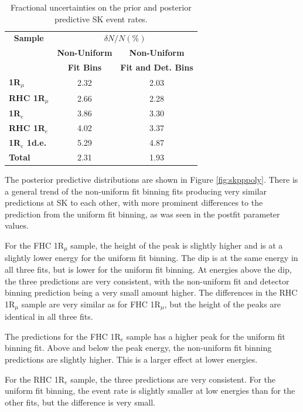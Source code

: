 \begin{center}
\begin{table}
\center
\begin{tabular}{l||c c}
\hline \hline
\multicolumn{1}{c||}{\textbf{Sample}} & \multicolumn{2}{c}{$\delta N/N (\%)$}\\
& \multicolumn{1}{c}{\textbf{Non-Uniform}} & \multicolumn{1}{c}{\textbf{Non-Uniform}}\\
& \multicolumn{1}{c}{\textbf{Fit Bins}} & \multicolumn{1}{c}{\textbf{Fit and Det. Bins}}\\
\hline\hline
\textbf{1R$_{\mu}$} & 2.32 & 2.03\\
\textbf{RHC 1R$_{\mu}$} & 2.66 & 2.28 \\ 
\textbf{1R$_{e}$} & 3.86 & 3.30\\
\textbf{RHC 1R$_{e}$} & 4.02 & 3.37\\
\textbf{1R$_{e}$ 1d.e.} & 5.29 & 4.87\\ \hline
\textbf{Total} & 2.31 & 1.93\\ \hline\hline
\end{tabular}
\caption{Fractional uncertainties on the prior and posterior predictive SK event rates.}
\label{tab:SKerr}
\end{table}
\end{center}

The posterior predictive distributions are shown in Figure \ref{fig:skpppoly}. There is a general trend of the non-uniform fit binning fits producing very similar predictions at SK to each other, with more prominent differences to the prediction from the uniform fit binning, as was seen in the postfit parameter values.

For the FHC 1R$_{\mu}$ sample, the height of the peak is slightly higher and is at a slightly lower energy for the uniform fit binning. The dip is at the same energy in all three fits, but is lower for the uniform fit binning. At energies above the dip, the three predictions are very consistent, with the non-uniform fit and detector binning prediction being a very small amount higher. The differences in the RHC 1R$_{\mu}$ sample are very similar as for FHC 1R$_{\mu}$, but the height of the peaks are identical in all three fits.

The predictions for the FHC 1R$_e$ sample has a higher peak for the uniform fit binning fit. Above and below the peak energy, the non-uniform fit binning predictions are slightly higher. This is a larger effect at lower energies.

For the RHC 1R$_e$ sample, the three predictions are very consistent. For the uniform fit binning, the event rate is slightly smaller at low energies than for the other fits, but the difference is very small.

